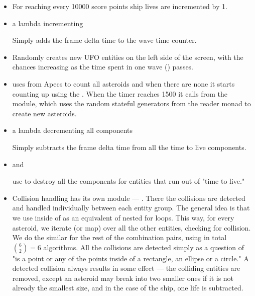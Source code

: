 \documentclass[
  digital, %
  table,   %
  twoside, %
  lof,     %
  lot,     %
]{fithesis3}
\begin{document}
\begin{itemize}[-]
    \item {}

    For reaching every 10000 score points ship lives are incremented by 1.

    \item a lambda incrementing 

    Simply adds the frame delta time  to the wave time counter.

    \item {}

    Randomly creates new UFO entities on the left side of the screen,
    with the chances increasing as the time spent in one wave () passes.

    \item {}

    uses  from Apecs to count all asteroids and
    when there are none it starts counting up using the .
    When the timer reaches 1500 it calls 
    from the  module, which uses the random stateful
    generators from the  reader monad to create new asteroids.

    \item a lambda decrementing all  components

    Simply subtracts the frame delta time  from all the time to live components.

    \item {} and 

    use  to destroy all the components for entities that run out of "time to live."

    \item {}

    Collision handling has its own module — .
    There the collisions are detected and handled individually between each
    entity group. The general idea is that we use  inside of 
    as an equivalent of nested for loops. This way, for every asteroid,
    we iterate (or map) over all the other entities, checking for collision.
    We do the similar for the rest of the combination pairs,
    using in total $\binom{6}{2} = 6$ algorithms. All the collisions are detected
    simply as a question of "is a point or any of the points inside of a rectangle,
    an ellipse or a circle." A detected collision always results in some effect
    — the colliding entities are removed, except an asteroid may break into two
    smaller ones if it is not already the smallest size, and
    in the case of the ship, one life is subtracted.

\end{itemize}
\end{document}
